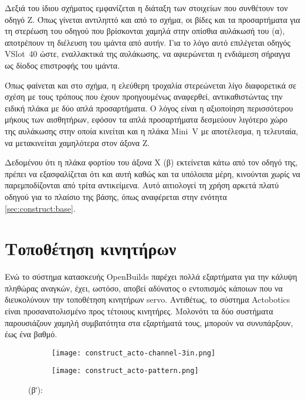 Δεξιά του ίδιου σχήματος εμφανίζεται η διάταξη των στοιχείων που συνθέτουν τον
οδηγό Z. Όπως γίνεται αντιληπτό και από το σχήμα, οι βίδες και τα προσαρτήματα
για τη στερέωση του οδηγού που βρίσκονται χαμηλά στην οπίσθια αυλάκωσή του (α),
αποτρέπουν τη διέλευση του ιμάντα από αυτήν. Για το λόγο αυτό επιλέγεται οδηγός
VSlot~40 ώστε, εναλλακτικά της αυλάκωσης, να αφιερώνεται η ενδιάμεση σήραγγα ως
δίοδος επιστροφής του ιμάντα.

Όπως φαίνεται και στο σχήμα, η ελεύθερη τροχαλία στερεώνεται λίγο διαφορετικά σε
σχέση με τους τρόπους που έχουν προηγουμένως αναφερθεί, αντικαθιστώντας την
ειδική πλάκα με δύο απλά προσαρτήματα. Ο λόγος είναι η αξιοποίηση περισσότερου
μήκους των αισθητήρων, εφόσον τα απλά προσαρτήματα δεσμεύουν λιγότερο χώρο της
αυλάκωσης στην οποία κινείται και η πλάκα Mini~V με αποτέλεσμα, η τελευταία, να
μετακινείται χαμηλότερα στον άξονα Z.

Δεδομένου ότι η πλάκα φορτίου του άξονα X (β) εκτείνεται κάτω από τον οδηγό της,
πρέπει να εξασφαλίζεται ότι και αυτή καθώς και τα υπόλοιπα μέρη, κινούνται χωρίς
να παρεμποδίζονται από τρίτα αντικείμενα. Αυτό αιτιολογεί τη χρήση αρκετά πλατύ
οδηγού για το πλαίσιο της βάσης, όπως αναφέρεται στην ενότητα
\ref{sec:construct:base}.

\section{Τοποθέτηση κινητήρων}

Ενώ το σύστημα κατασκευής OpenBuilds παρέχει πολλά εξαρτήματα για την κάλυψη
πληθώρας αναγκών, έχει, ωστόσο, αποβεί αδύνατος ο εντοπισμός κάποιων που να
διευκολύνουν την τοποθέτηση κινητήρων servo. Αντιθέτως, το σύστημα Actobotics
είναι προσανατολισμένο προς τέτοιους κινητήρες. Μολονότι τα δύο συστήματα
παρουσιάζουν χαμηλή συμβατότητα στα εξαρτήματά τους, μπορούν να συνυπάρξουν, έως
ένα βαθμό.

\begin{figure}
    \caption{Κανάλι Actobotics και διάταξη οπών.
        \label{fig:construct:acto-channel-pattern}}
    \begin{center}
        \begin{subfigure}[b]{0.40\textwidth}
            \texttt{[image: construct\_acto-channel-3in.png]}
            \caption{}
        \end{subfigure}
        \begin{subfigure}[b]{0.35\textwidth}
            \texttt{[image: construct\_acto-pattern.png]}
            \caption{}
        \end{subfigure}
    \end{center}

    (βʹ): 
\end{figure}

